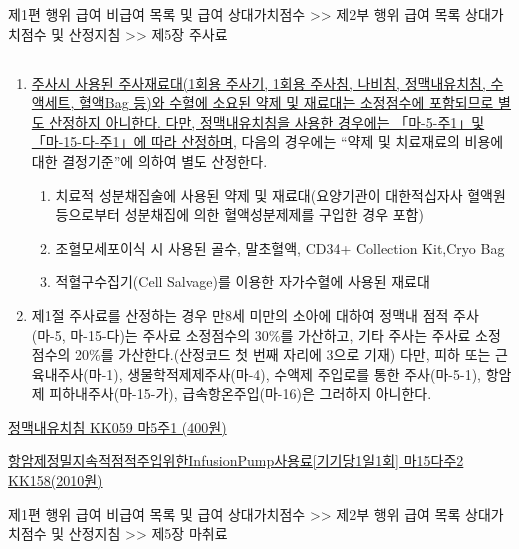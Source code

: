 \begin{mdframed}[linecolor=blue,middlelinewidth=2]  
제1편 행위 급여 \cntrdot{}  비급여 목록 및 급여 상대가치점수 >> 제2부 행위 급여 목록\cntrdot{} 상대가치점수 및 산정지침 >> 제5장 주사료
\end{mdframed}
\subsection{}
\begin{enumerate}[(1)]\tightlist
\item \uline{주사시 사용된 주사재료대(1회용 주사기, 1회용 주사침, 나비침, 정맥내유치침, 수액세트, 혈액Bag 등)와 수혈에 소요된 약제 및 재료대는 소정점수에 포함되므로 별도 산정하지 아니한다. 다만, 정맥내유치침을 사용한 경우에는 「마-5-주1」및「마-15-다-주1」에 따라 산정하며,} 다음의 경우에는 “약제 및 치료재료의 비용에 대한 결정기준”에 의하여 별도 산정한다.
	\begin{enumerate}[(가)]\tightlist
	\item 치료적 성분채집술에 사용된 약제 및 재료대(요양기관이 대한적십자사 혈액원 등으로부터 성분채집에 의한 혈액성분제제를 구입한 경우 포함)
	\item 조혈모세포이식 시 사용된 골수, 말초혈액, CD34+ Collection Kit,Cryo Bag
	\item 적혈구수집기(Cell Salvage)를 이용한 자가수혈에 사용된 재료대
	\end{enumerate}
\item 제1절 주사료를 산정하는 경우 만8세 미만의 소아에 대하여 정맥내 점적 주사(마-5, 마-15-다)는 주사료 소정점수의 30\%를 가산하고, 기타 주사는 주사료 소정점수의 20\%를 가산한다.(산정코드 첫 번째 자리에 3으로 기재) 다만, 피하 또는 근육내주사(마-1), 생물학적제제주사(마-4), 수액제 주입로를 통한 주사(마-5-1), 항암제 피하내주사(마-15-가), 급속항온주입(마-16)은 그러하지 아니한다.
\end{enumerate}
\uline{정맥내유치침 KK059 마5주1 (400원)} \par
\uline{항암제정밀지속적점적주입위한InfusionPump사용료[기기당1일1회] 마15다주2 KK158(2010원)}\par

\begin{mdframed}[linecolor=blue,middlelinewidth=2]  
제1편 행위 급여 \cntrdot{}  비급여 목록 및 급여 상대가치점수 >> 제2부 행위 급여 목록\cntrdot{} 상대가치점수 및 산정지침 >> 제5장 마취료
\end{mdframed}
